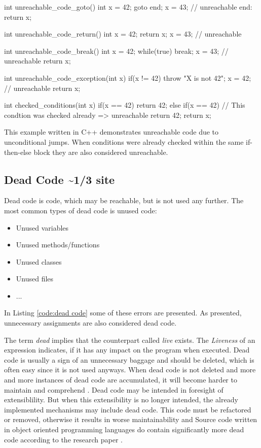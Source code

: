 \begin{program}
	\begin{CppCode}
int unreachable_code_goto() {
	int x = 42;
	goto end;
	x = 43; // unreachable
	end: return x;
}

int unreachable_code_return() {
	int x = 42;
	return x;
	x = 43; // unreachable
}

int unreachable_code_break() {
	int x = 42;
	while(true) {
		break;
		x = 43; // unreachable
	}
	return x;
}

int unreachable_code_exception(int x) {
	if(x != 42) {
		throw "X is not 42";
		x = 42; // unreachable
	}
	return x;
}

int checked_conditions(int x) {
	if(x == 42) {
		return 42;
	} else if(x == 42) { // This condtion was checked already => unreachable
		return 42;
	}
	return x;
}\end{CppCode}
	\caption{This example written in C++ demonstrates unreachable code due to unconditional jumps. When conditions were already checked within the same if-then-else block they are also considered unreachable.}
	\label{code:unconditional unreachable code}
\end{program}


\subsection{Dead Code \textasciitilde 1/3 site}
\label{sub:dead code}

Dead code is code, which may be reachable, but is not used any further.
The most common types of dead code is unused code:
\begin{itemize}
	\item Unused variables \cite{Prahofer_2012}
	\item Unused methods/functions \cite{Romano_2016}
	\item Unused classes
	\item Unused files \cite{Boomsma_2012}
	\item ...
\end{itemize}
In Listing \ref{code:dead code} some of these errors are presented. As presented, unnecessary assignments are also considered dead code.


The term \emph{dead} implies that the counterpart called \emph{live} exists. 
The \emph{Liveness} of an expression indicates, if it has any impact on the program when executed.
Dead code is usually a sign of an unnecessary baggage and should be deleted, which is often easy since it is not used anyways.
When dead code is not deleted and more and more instances of dead code are accumulated, it will become harder to maintain and comprehend \cite{Romano_2020}. Dead code may be intended in foresight of extensiblility. But when this extensibility is no longer intended, the already implemented mechanisms may include dead code. This code must be refactored or removed, otherwise it results in worse maintainability and 
Source code written in object oriented programming languages do contain significantly more dead code according to the research paper \cite{Srivastava_1992}.


